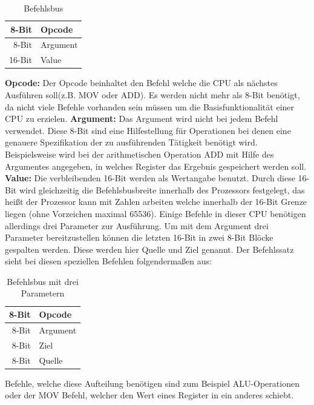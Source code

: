 \documentclass[12pt]{article}
\begin{document}
\begin{table}[!htb]
\centering
\label{Befehlsbus}
\begin{tabular}{|r|l|}
  \hline
  8-Bit & Opcode \\
  \hline
  8-Bit & Argument \\ 
  \hline
  16-Bit & Value\\
  \hline
  
\end{tabular}
\caption{Befehlsbus}
\end{table}
\noindent
\textbf{Opcode: } Der Opcode beinhaltet den Befehl welche die CPU als nächstes Ausführen soll(z.B. MOV oder ADD). Es werden nicht mehr als 8-Bit benötigt, da nicht viele Befehle vorhanden sein müssen um die Basisfunktionalität einer CPU zu erzielen.
\newline
\textbf{Argument: } Das Argument wird nicht bei jedem Befehl verwendet. Diese 8-Bit sind eine Hilfestellung für Operationen bei denen eine genauere Spezifikation der zu ausführenden Tätigkeit benötigt wird. Beispielsweise wird bei der arithmetischen Operation ADD mit Hilfe des Argumentes angegeben, in welches Register das Ergebnis gespeichert werden soll.
\newline
\textbf{Value: } Die verbleibenden 16-Bit werden als Wertangabe benutzt. Durch diese 16-Bit wird gleichzeitig die Befehlsbusbreite innerhalb des Prozessors festgelegt, das heißt der Prozessor kann mit Zahlen arbeiten welche innerhalb der 16-Bit Grenze liegen (ohne Vorzeichen maximal 65536). Einige Befehle in dieser CPU benötigen allerdings drei Parameter zur Ausführung. Um mit dem Argument drei Parameter bereitzustellen können die letzten 16-Bit in zwei 8-Bit Blöcke gespalten werden. Diese werden hier Quelle und Ziel genannt. Der Befehlssatz sieht bei diesen speziellen Befehlen folgendermaßen aus: 
\begin{table}[!htb]
\centering
\caption{Befehlsbus mit drei Parametern}
\label{Befehlsbus3P}
\begin{tabular}{|r|l|}
  \hline
  8-Bit & Opcode \\
  \hline
  8-Bit & Argument \\ 
  \hline
  8-Bit & Ziel\\
  \hline
  8-Bit & Quelle\\
  \hline
\end{tabular}
\end{table}
\newline
Befehle, welche diese Aufteilung benötigen sind zum Beispiel ALU-Operationen oder der MOV Befehl, welcher den Wert eines Register in ein anderes schiebt.
\end{document}
